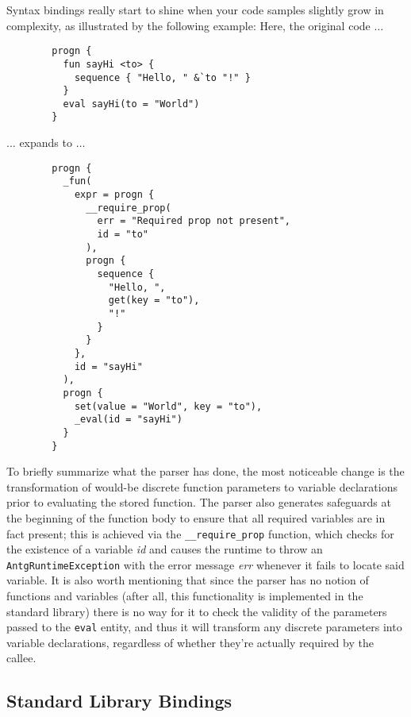 \begin{multicols*}{2}
	Syntax bindings really start to shine when your code samples slightly grow in complexity, as illustrated by the following example:
	\vfill\columnbreak\noindent
	Here, the original code $\dots$
	\begin{verbatim}
		progn {
		  fun sayHi <to> {
		    sequence { "Hello, " &`to "!" }
		  }
		  eval sayHi(to = "World")
		}
	\end{verbatim}
	$\dots$ expands to $\dots$
	\begin{verbatim}
		progn {
		  _fun(
		    expr = progn {
		      __require_prop(
		        err = "Required prop not present",
		        id = "to"
		      ),
		      progn {
		        sequence {
		          "Hello, ",
		          get(key = "to"),
		          "!"
		        }
		      }
		    },
		    id = "sayHi"
		  ),
		  progn {
		    set(value = "World", key = "to"),
		    _eval(id = "sayHi")
		  }
		}
	\end{verbatim}
	To briefly summarize what the parser has done, the most noticeable change is the transformation of would-be
	discrete function parameters to variable declarations prior to evaluating the stored function.
	The parser also generates safeguards at the beginning of the function body to ensure that all required
	variables are in fact present; this is achieved via the \verb|__require_prop| function, which checks
	for the existence of a variable \textit{id} and causes the runtime to throw an \verb|AntgRuntimeException|
	with the error message \textit{err} whenever it fails to locate said variable.
	It is also worth mentioning that since the parser has no notion of functions and variables (after all, this functionality
	is implemented in the standard library) there is no way for it to check the validity of the parameters passed to the
	\verb|eval| entity, and thus it will transform any discrete parameters into variable declarations, regardless of whether
	they're actually required by the callee.
\end{multicols*}
\newpage

\subsection{Standard Library Bindings}

\begin{multicols*}{2}
\end{multicols*}